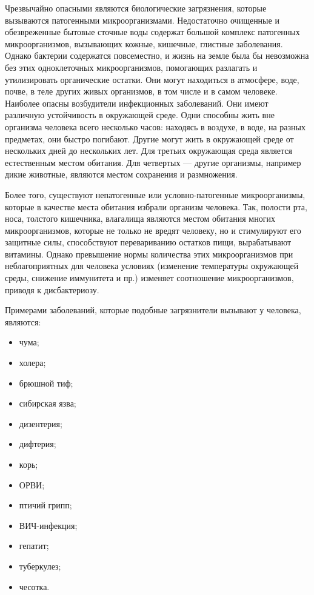 \documentclass[a4paper, 12pt]{extarticle}
\begin{document}
Чрезвычайно опасными являются биологические загрязнения, которые вызываются патогенными микроорганизмами. Недостаточно очищенные и обезвреженные бытовые сточные воды содержат большой комплекс патогенных микроорганизмов, вызывающих кожные, кишечные, глистные заболевания. Однако бактерии содержатся повсеместно, и жизнь на земле была бы невозможна без этих одноклеточных микроорганизмов, помогающих разлагать и утилизировать органические остатки. Они могут находиться в атмосфере, воде, почве, в теле других живых организмов, в том числе и в самом человеке. Наиболее опасны возбудители инфекционных заболеваний. Они имеют различную устойчивость в окружающей среде. Одни способны жить вне организма человека всего несколько часов: находясь в воздухе, в воде, на разных предметах, они быстро погибают. Другие могут жить в окружающей среде от нескольких дней до нескольких лет. Для третьих окружающая среда является естественным местом обитания. Для четвертых — другие организмы, например дикие животные, являются местом сохранения и размножения.

Более того, существуют непатогенные или условно-патогенные микроорганизмы, которые в качестве места обитания избрали организм человека. Так, полости рта, носа, толстого кишечника, влагалища являются местом обитания многих микроорганизмов, которые не только не  вредят человеку, но и стимулируют его защитные силы, способствуют перевариванию остатков пищи, вырабатывают витамины. Однако превышение нормы количества этих микроорганизмов при неблагоприятных для  человека условиях (изменение температуры окружающей среды, снижение  иммунитета и пр.) изменяет соотношение микроорганизмов, приводя к дисбактериозу.

Примерами заболеваний, которые подобные загрязнители вызывают у человека, являются:
\begin{itemize}
    \item чума;
    \item холера;
    \item брюшной тиф;
    \item сибирская язва;
    \item дизентерия;
    \item дифтерия;
    \item корь;
    \item ОРВИ;
    \item птичий грипп;
    \item ВИЧ-инфекция;
    \item гепатит;
    \item туберкулез;
    \item чесотка.
\end{itemize}
\end{document}
